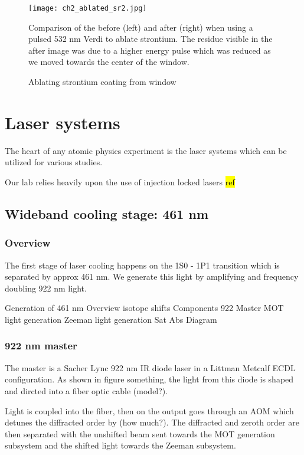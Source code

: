 	\begin{figure}
		\centerline{
		\texttt{[image: ch2\_ablated\_sr2.jpg]}}
		\caption{Ablating strontium coating from window}{Comparison of the before (left) and after (right) when using a pulsed 532 nm Verdi to ablate strontium. The residue visible in the after image was due to a higher energy pulse which was reduced as we moved towards the center of the window.}
		\label{fig:ablating_strontium}
	\end{figure} 



\section{Laser systems}\label{sec:laser_systems}

The heart of any atomic physics experiment is the laser systems which can be utilized for various studies. 

Our lab relies heavily upon the use of injection locked lasers \hl{ref}

\subsection{Wideband cooling stage: 461 nm}
\label{ssec:461sys}

\subsubsection{Overview}

The first stage of laser cooling happens on the 1S0 - 1P1 transition which is separated by approx 461 nm. We generate this light by amplifying and frequency doubling 922 nm light.

Generation of 461 nm
	Overview
		isotope shifts
	Components
		922 Master
		MOT light generation
		Zeeman light generation
		Sat Abs
	Diagram

\subsubsection{922 nm master}

The master is a Sacher Lync 922 nm IR diode laser in a Littman Metcalf ECDL configuration. 
As shown in figure something, the light from this diode is shaped and dircted into a fiber optic cable (model?). 

Light is coupled into the fiber, then on the output goes through an AOM which detunes the diffracted order by (how much?). The diffracted and zeroth order are then separated with the unshifted beam sent towards the MOT generation subsystem and the shifted light towards the Zeeman subsystem.

